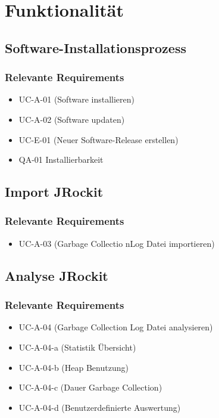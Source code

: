 \section{Funktionalität}
\subsection{Software-Installationsprozess}
\subsubsection{Relevante Requirements}
\begin{itemize}
	\item UC-A-01 (Software installieren)
	\item UC-A-02 (Software updaten)
	\item UC-E-01 (Neuer Software-Release erstellen)
	\item QA-01 Installierbarkeit
\end{itemize}


\subsection{Import JRockit}
\subsubsection{Relevante Requirements}
\begin{itemize}
	\item UC-A-03 (Garbage Collectio nLog Datei importieren)
\end{itemize}

\subsection{Analyse JRockit}
\subsubsection{Relevante Requirements}
\begin{itemize}
	\item UC-A-04 (Garbage Collection Log Datei analysieren)
	\item UC-A-04-a (Statistik Übersicht)
	\item UC-A-04-b (Heap Benutzung)
	\item UC-A-04-c (Dauer Garbage Collection)
	\item UC-A-04-d (Benutzerdefinierte Auswertung)
\end{itemize}




